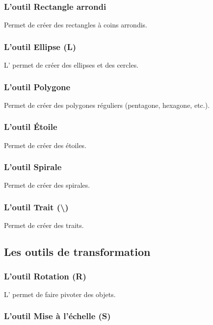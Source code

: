 \subsubsection{L'outil Rectangle arrondi}

Permet de créer des rectangles à coins arrondis.

\subsubsection{L'outil Ellipse (L)}

L' permet de créer des ellipses et des cercles.

\subsubsection{L'outil Polygone}

Permet de créer des polygones réguliers (pentagone, hexagone, etc.).

\subsubsection{L'outil Étoile}

Permet de créer des étoiles.

\subsubsection{L'outil Spirale}

Permet de créer des spirales.

\subsubsection[L'outil Trait (\textbackslash)]{L'outil Trait (\textbackslash)}

Permet de créer des traits.

\subsection{Les outils de transformation}

\subsubsection{L'outil Rotation (R)}

L' permet de faire pivoter des objets.

\subsubsection{L'outil Mise à l'échelle (S)}


